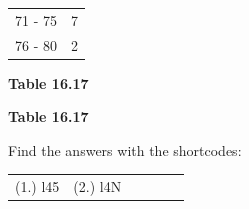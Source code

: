 \begin{description}[noitemsep]
\begin{description}[noitemsep]
\begin{enumerate}[noitemsep, label=\textbf{\arabic*}. ]
\begin{table}
\begin{center}
\begin{xtabular}[t]{|l|l|}
        71 - 75 &
        7%
     \tabularnewline{}
        76 - 80 &
        2%
     \tabularnewline{}
    \end{xtabular}
      \end{center}
    \begin{center}{\small\bfseries Table 16.17}\end{center}
    \begin{caption}{\small\bfseries Table 16.17}\end{caption}
\end{table}
    \par
          \end{enumerate}
  \label{m39400**end}
\par {} Find the answers with the shortcodes:
 \par \begin{tabular}[h]{cccccc}
 (1.) l45  &  (2.) l4N  & \end{tabular}
%     
%     
%     

\end{description}
\end{description}
